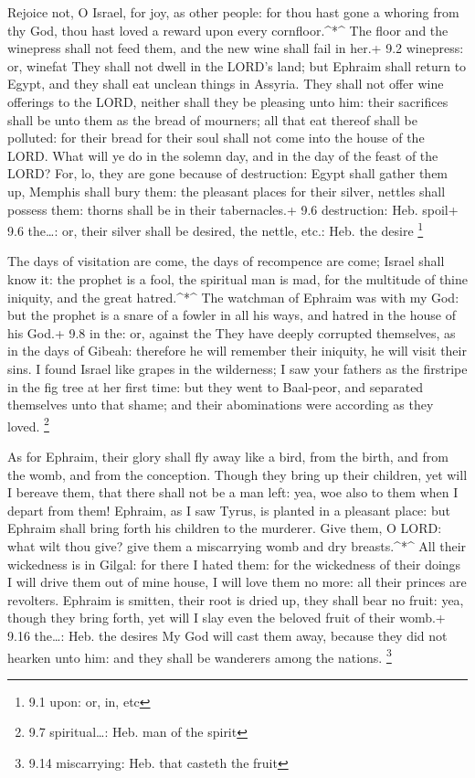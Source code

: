  Rejoice not, O Israel, for joy, as other people: for thou
hast gone a whoring from thy God, thou hast loved a reward upon every
cornfloor.\^{}*\^{}  The floor and the winepress shall not
feed them, and the new wine shall fail in her.+ 9.2 winepress: or,
winefat  They shall not dwell in the LORD's land; but
Ephraim shall return to Egypt, and they shall eat unclean things in
Assyria.  They shall not offer wine offerings to the LORD,
neither shall they be pleasing unto him: their sacrifices shall be unto
them as the bread of mourners; all that eat thereof shall be polluted:
for their bread for their soul shall not come into the house of the
LORD.  What will ye do in the solemn day, and in the day of
the feast of the LORD?  For, lo, they are gone because of
destruction: Egypt shall gather them up, Memphis shall bury them: the
pleasant places for their silver, nettles shall possess them: thorns
shall be in their tabernacles.+ 9.6 destruction: Heb. spoil+ 9.6
the\ldots: or, their silver shall be desired, the nettle, etc.: Heb. the
desire \footnote{9.1 upon: or, in, etc}

 The days of visitation are come, the days of recompence are
come; Israel shall know it: the prophet is a fool, the spiritual man is
mad, for the multitude of thine iniquity, and the great hatred.\^{}*\^{}
 The watchman of Ephraim was with my God: but the prophet is
a snare of a fowler in all his ways, and hatred in the house of his
God.+ 9.8 in the: or, against the  They have deeply
corrupted themselves, as in the days of Gibeah: therefore he will
remember their iniquity, he will visit their sins.  I found
Israel like grapes in the wilderness; I saw your fathers as the
firstripe in the fig tree at her first time: but they went to Baal-peor,
and separated themselves unto that shame; and their abominations were
according as they loved. \footnote{9.7 spiritual\ldots: Heb. man of the
  spirit}

 As for Ephraim, their glory shall fly away like a bird,
from the birth, and from the womb, and from the conception.
 Though they bring up their children, yet will I bereave
them, that there shall not be a man left: yea, woe also to them when I
depart from them!  Ephraim, as I saw Tyrus, is planted in a
pleasant place: but Ephraim shall bring forth his children to the
murderer.  Give them, O LORD: what wilt thou give? give
them a miscarrying womb and dry breasts.\^{}*\^{}  All
their wickedness is in Gilgal: for there I hated them: for the
wickedness of their doings I will drive them out of mine house, I will
love them no more: all their princes are revolters. 
Ephraim is smitten, their root is dried up, they shall bear no fruit:
yea, though they bring forth, yet will I slay even the beloved fruit of
their womb.+ 9.16 the\ldots: Heb. the desires  My God will
cast them away, because they did not hearken unto him: and they shall be
wanderers among the nations. \footnote{9.14 miscarrying: Heb. that
  casteth the fruit}

